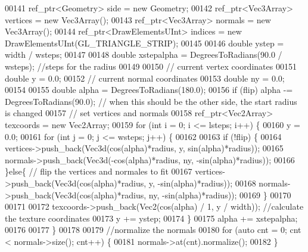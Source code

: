 \begin{DoxyCode}
00141         ref\_ptr<Geometry> side = \textcolor{keyword}{new} Geometry;
00142         ref\_ptr<Vec3Array> vertices = \textcolor{keyword}{new} Vec3Array();
00143         ref\_ptr<Vec3Array> normals = \textcolor{keyword}{new} Vec3Array();
00144         ref\_ptr<DrawElementsUInt> indices = \textcolor{keyword}{new} DrawElementsUInt(GL\_TRIANGLE\_STRIP);
00145 
00146         \textcolor{keywordtype}{double} ystep = width / wsteps;
00147         
00148         \textcolor{keywordtype}{double} xstepalpha = DegreesToRadians(90.0 / wsteps); \textcolor{comment}{//steps for the radius}
00149 
00150         \textcolor{comment}{// current vertex coordinates       }
00151         \textcolor{keywordtype}{double} y = 0.0;
00152         \textcolor{comment}{//  current normal coordinates      }
00153         \textcolor{keywordtype}{double} ny = 0.0;
00154 
00155         \textcolor{keywordtype}{double} alpha = DegreesToRadians(180.0);
00156         \textcolor{keywordflow}{if} (flip)  alpha -= DegreesToRadians(90.0); \textcolor{comment}{// when this should be the other side, the start radius
       is changed }
00157         \textcolor{comment}{// set vertices and normals}
00158         ref\_ptr<Vec2Array> texcoords = \textcolor{keyword}{new} Vec2Array;
00159         \textcolor{keywordflow}{for} (\textcolor{keywordtype}{int} i = 0; i <= lsteps; i++) \{
00160             y = 0.0;
00161             \textcolor{keywordflow}{for} (\textcolor{keywordtype}{int} j = 0; j <= wsteps; j++) \{
00162 
00163                 \textcolor{keywordflow}{if} (!flip) \{
00164                     vertices->push\_back(Vec3d(cos(alpha)*radius, y, sin(alpha)*radius));
00165                     normals->push\_back(Vec3d(-cos(alpha)*radius, ny, -sin(alpha)*radius));
00166                 \}\textcolor{keywordflow}{else}\{ \textcolor{comment}{// flip the vertices and normales to fit}
00167                     vertices->push\_back(Vec3d(cos(alpha)*radius, y, -sin(alpha)*radius));
00168                     normals->push\_back(Vec3d(cos(alpha)*radius, ny, -sin(alpha)*radius));
00169                 \}
00170 
00171 
00172                 texcoords->push\_back(Vec2(cos(alpha) / 1, y / width)); \textcolor{comment}{//calculate the texture coordinates}
00173                 y += ystep;
00174             \}
00175             alpha += xstepalpha;
00176 
00177         \}
00178     
00179         \textcolor{comment}{//normalize the normals}
00180         \textcolor{keywordflow}{for} (\textcolor{keyword}{auto} cnt = 0; cnt < normals->size(); cnt++) \{
00181             normals->at(cnt).normalize();
00182         \}

\end{DoxyCode}
